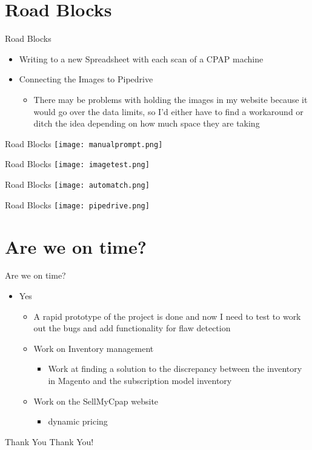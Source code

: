 \documentclass[aspectratio=1610]{beamer}
\begin{document}
\section{Road Blocks}
\begin{frame}{Road Blocks}
    \begin{itemize}
        \item Writing to a new Spreadsheet with each scan of a CPAP machine
        \item Connecting the Images to Pipedrive
        \begin{itemize}
            \item There may be problems with holding the images in my website because it would go over the data limits, so I'd either have to find a workaround or ditch the idea depending on how much space they are taking
        \end{itemize}
    \end{itemize}
\end{frame}
\begin{frame}{Road Blocks}
    \texttt{[image: manualprompt.png]}
\end{frame}
\begin{frame}{Road Blocks}
    \texttt{[image: imagetest.png]}
\end{frame}
\begin{frame}{Road Blocks}
    \texttt{[image: automatch.png]}
\end{frame}
\begin{frame}{Road Blocks}
    \texttt{[image: pipedrive.png]}
\end{frame} 
\section{Are we on time?}
\begin{frame}{Are we on time?}
    \begin{itemize}
        \item Yes
        \begin{itemize}
            \item A rapid prototype of the project is done and now I need to test to work out the bugs and add functionality for flaw detection
            \item Work on Inventory management 
            \begin{itemize}
                \item Work at finding a solution to the discrepancy between the inventory in Magento and the subscription model inventory
            \end{itemize}
            \item Work on the SellMyCpap website
            \begin{itemize}
                \item dynamic pricing
            \end{itemize}
        \end{itemize}
    \end{itemize}





\end{frame}

\begin{frame}{Thank You}
    \centering
    \Huge Thank You!
\end{frame}
\end{document}
